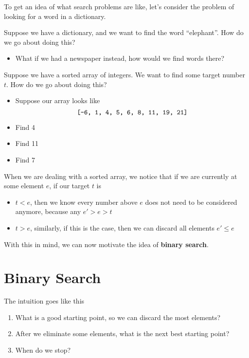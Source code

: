 \documentclass{article}
\begin{document}
To get an idea of what search problems are like, let's consider the problem of looking for a word in a dictionary.

\begin{example}
    Suppose we have a dictionary, and we want to find the word ``elephant''. How do we go about doing this?
    \begin{itemize}
        \item What if we had a newspaper instead, how would we find words there?
    \end{itemize}
\end{example}

\begin{example}
   Suppose we have a sorted array of integers. We want to find some target number $t$. How do we go about doing this?
   
   \begin{itemize}
    \item Suppose our array looks like 
        \begin{equation*}
            \texttt{
                [-6, 1, 4, 5, 6, 8, 11, 19, 21]
            }
        \end{equation*}
    \item Find 4
    \item Find 11
    \item Find 7
   \end{itemize}
\end{example}

When we are dealing with a sorted array, we notice that if we are currently at some element $e$, if our target $t$ is 
\begin{itemize}
    \item $t < e$, then we know every number above $e$ does not need to be considered anymore, because any $e' > e > t$
    \item $t > e$, similarly, if this is the case, then we can discard all elements $e' \leq e$
\end{itemize}

With this in mind, we can now motivate the idea of \textbf{binary search}.

\section{Binary Search}

The intuition goes like this 
\begin{enumerate}
    \item What is a good starting point, so we can discard the most elements?
    \item After we eliminate some elements, what is the next best starting point?
    \item When do we stop?
\end{enumerate}
\end{document}
